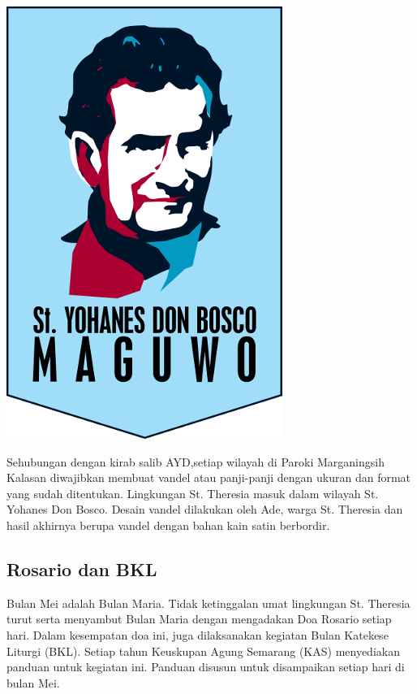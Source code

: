 \begin{floatingfigure}[r]{1.7cm}
	\begin{center}
		\includegraphics[scale=0.15]{don-bosco-025.png}
	\end{center}
\end{floatingfigure}


Sehubungan dengan kirab salib AYD,setiap wilayah di Paroki Marganingsih Kalasan diwajibkan membuat vandel atau panji-panji dengan ukuran dan format yang sudah ditentukan. Lingkungan St. Theresia masuk dalam wilayah St. Yohanes Don Bosco. Desain vandel dilakukan oleh Ade, warga St. Theresia dan hasil akhirnya berupa vandel dengan bahan kain satin berbordir. 

\subsection*{Rosario dan BKL}
Bulan Mei adalah Bulan Maria. Tidak ketinggalan umat lingkungan St. Theresia turut serta menyambut Bulan Maria dengan mengadakan Doa Rosario setiap hari. Dalam kesempatan doa ini, juga dilaksanakan kegiatan Bulan Katekese Liturgi (BKL). Setiap tahun Keuskupan Agung Semarang (KAS) menyediakan panduan untuk kegiatan ini. Panduan disusun untuk disampaikan setiap hari di bulan Mei.

